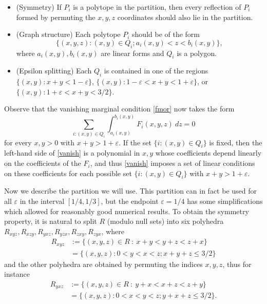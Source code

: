 \documentclass{bmcart}
\theoremstyle{plain}
\theoremstyle{definition}
\newcommand\eps{\varepsilon}
\begin{document}
\begin{itemize}
\item (Symmetry) If $P_i$ is a polytope in the partition, then every reflection of $P_i$ formed by permuting the $x,y,z$ coordinates should also lie in the partition.
\item (Graph structure) Each polytope $P_i$ should be of the form
\begin{equation}\label{qi-form}
\{ (x,y,z): (x,y) \in Q_i; a_i(x,y) < z < b_i(x,y)\},
\end{equation}
where $a_i(x,y), b_i(x,y)$ are linear forms and $Q_i$ is a polygon.
\item (Epsilon splitting)  Each $Q_i$ is contained in one of the regions $\{ (x,y): x+y < 1-\eps\}$, $\{ (x,y): 1-\eps < x+y < 1+\eps \}$, or $\{ (x,y): 1+\eps < x+y < 3/2 \}$.
\end{itemize}

Observe that the vanishing marginal condition \eqref{fmor} now takes the form
\begin{equation}\label{vanish}
 \sum_{i: (x,y) \in Q_i} \int_{a_i(x,y)}^{b_i(x,y)} F_i(x,y,z)\ dz = 0
\end{equation}
for every $x,y > 0$ with $x+y > 1+\eps$.  If the set $\{i: (x,y) \in Q_i\}$ is fixed, then the left-hand side of \eqref{vanish} is a polynomial in $x,y$ whose coefficients depend linearly on the coefficients of the $F_i$, and thus \eqref{vanish} imposes a set of linear conditions on these coefficients for each possible set $\{ i: (x,y) \in Q_i\}$ with $x+y > 1+\eps$.

Now we describe the partition we will use.  This partition can in fact be used for all $\eps$ in the interval $[1/4,1/3]$, but the endpoint $\eps = 1/4$ has some simplifications which allowed for reasonably good numerical results.  To obtain the symmetry property, it is natural to split $R$ (modulo null sets) into six polyhedra $R_{xyz}, R_{xzy}, R_{yxz}, R_{yzx}, R_{zxy}, R_{zyx}$, where
\begin{align*}
 R_{xyz} &:= \{(x,y,z)\in R\ :\ x+y < y+z < z+x\} \\
&= \{(x,y,z): 0 < y < x < z; x+y+z \leq 3/2 \}
\end{align*}
and the other polyhedra are obtained by permuting the indices $x,y,z$, thus for instance
\begin{align*}
R_{yxz} &:= \{(x,y,z)\in R\ :\ y+x < x+z < z+y\} \\
&= \{(x,y,z): 0 < x < y < z; y+x+z \leq 3/2 \}.
\end{align*}
\end{document}
